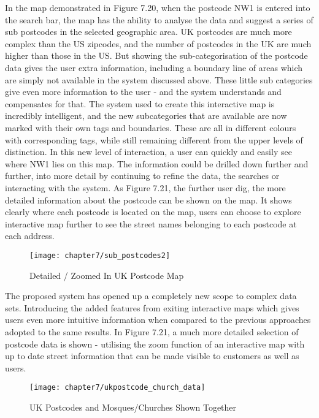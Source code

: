 In the map demonstrated in Figure 7.20, when the postcode NW1 is entered into the search bar, the map has the ability to analyse the data and suggest a series of sub postcodes in the selected geographic area. UK postcodes are much more complex than the US zipcodes, and the number of postcodes in the UK are much higher than those in the US. But showing the sub-categorisation of the postcode data gives the user extra information, including a boundary line of areas which are simply not available in the system discussed above. These little sub categories give even more information to the user - and the system understands and compensates for that. The system used to create this interactive map is incredibly intelligent, and the new subcategories that are available are now marked with their own tags and boundaries. These are all in different colours with corresponding tags, while still remaining different from the upper levels of distinction. In this new level of interaction, a user can quickly and easily see where NW1 lies on this map. The information could be drilled down further and further, into more detail by continuing to refine the data, the searches or interacting with the system. As Figure 7.21, the further user dig, the more detailed information about the postcode can be shown on the map. It shows clearly where each postcode is located on the map, users can choose to explore interactive map further to see the street names belonging to each postcode at each address.

\begin{figure}[H]
\centering
\texttt{[image: chapter7/sub\_postcodes2]}
\caption{ Detailed / Zoomed In UK Postcode Map}
\end{figure}

The proposed system has opened up a completely new scope to complex data sets. Introducing the added features from exiting interactive maps which gives users even more intuitive information when compared to the previous approaches adopted to the same results. In Figure 7.21, a much more detailed selection of postcode data is shown - utilising the zoom function of an interactive map with up to date street information that can be made visible to customers as well as users.

\begin{figure}[H]
\centering
\texttt{[image: chapter7/ukpostcode\_church\_data]}
\caption{ UK Postcodes and Mosques/Churches Shown Together}
\end{figure}

